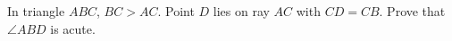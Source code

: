 In triangle $ABC$, $BC>AC$. Point $D$ lies on ray $AC$ with $CD=CB$. Prove that $\angle ABD$ is acute.
